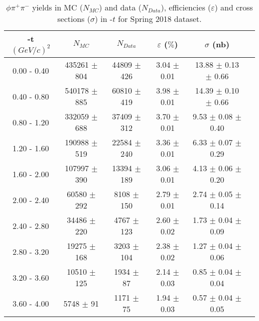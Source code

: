 \begin{center}
\begin{table}[H]
    \caption{$\phi \pi^{+}\pi^{-}$ yields in MC ($N_{MC}$) and data ($N_{Data}$), efficiencies ($\varepsilon$) and cross sections ($\sigma$) in -$t$ for Spring 2018 dataset.}
    \label{tab.xsec_ul.phi2pi.3.2}
    \begin{tabular}{|c|c|c|c|c|c|}
    \hline
    -t $(GeV/c)^{2}$ & $N_{MC}$ & $N_{Data}$ & $\varepsilon$ ($\%$) & $\sigma$ (nb) \\ 
    \hline
    0.00 - 0.40 & 435261 $\pm$ 804 & 44809 $\pm$ 426 & 3.04 $\pm$ 0.01 & 13.88 $\pm$ 0.13 $\pm$ 0.66 \\ 
    0.40 - 0.80 & 540178 $\pm$ 885 & 60810 $\pm$ 419 & 3.98 $\pm$ 0.01 & 14.39 $\pm$ 0.10 $\pm$ 0.66 \\ 
    0.80 - 1.20 & 332059 $\pm$ 688 & 37409 $\pm$ 312 & 3.70 $\pm$ 0.01 & 9.53 $\pm$ 0.08 $\pm$ 0.40 \\ 
    1.20 - 1.60 & 190988 $\pm$ 519 & 22584 $\pm$ 240 & 3.36 $\pm$ 0.01 & 6.33 $\pm$ 0.07 $\pm$ 0.29 \\ 
    1.60 - 2.00 & 107997 $\pm$ 390 & 13394 $\pm$ 189 & 3.06 $\pm$ 0.01 & 4.13 $\pm$ 0.06 $\pm$ 0.20 \\ 
    2.00 - 2.40 & 60580 $\pm$ 292 & 8108 $\pm$ 150 & 2.79 $\pm$ 0.01 & 2.74 $\pm$ 0.05 $\pm$ 0.14 \\ 
    2.40 - 2.80 & 34486 $\pm$ 220 & 4767 $\pm$ 123 & 2.60 $\pm$ 0.02 & 1.73 $\pm$ 0.04 $\pm$ 0.09 \\ 
    2.80 - 3.20 & 19275 $\pm$ 168 & 3203 $\pm$ 104 & 2.38 $\pm$ 0.02 & 1.27 $\pm$ 0.04 $\pm$ 0.06 \\ 
    3.20 - 3.60 & 10510 $\pm$ 125 & 1934 $\pm$ 87 & 2.14 $\pm$ 0.03 & 0.85 $\pm$ 0.04 $\pm$ 0.04 \\ 
    3.60 - 4.00 & 5748 $\pm$ 91 & 1171 $\pm$ 75 & 1.94 $\pm$ 0.03 & 0.57 $\pm$ 0.04 $\pm$ 0.05 \\ 
   \hline
\end{tabular}
\end{table}
\null
\vfill
\end{center}
 
